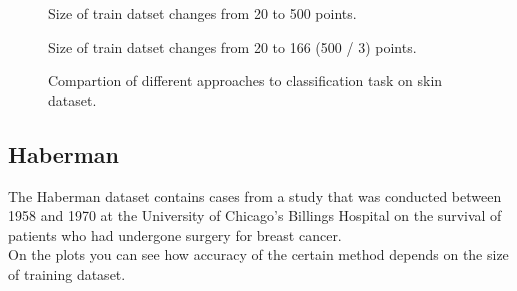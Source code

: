 \documentclass[a4paper]{article}
\begin{document}
\begin{figure}[h]
\begin{minipage}[c]{0.49\linewidth}
 Size of train datset changes from 20 to 500 points.
\end{minipage}
\vfill
\begin{minipage}[c]{0.49\linewidth}
 Size of train datset changes from 20 to 166 (500 / 3) points.
\end{minipage}
\caption{Compartion of different approaches to classification task on skin dataset.}
\label{Skinacc}
\end{figure}

\clearpage
\subsection{Haberman}

The Haberman dataset contains cases from a study that was conducted between 1958 and 1970 at the University of Chicago's Billings Hospital on the survival of patients who had undergone surgery for breast cancer.
\\
On the plots you can see how accuracy of the certain method depends on the size of training dataset.
\end{document}
